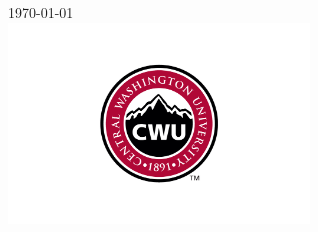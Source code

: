 \documentclass[12pt]{article}
\begin{document}
\begin{titlepage}
        
        \vspace{2cm}
        {\large \today}\\ %
        
        
        \includegraphics[width=8cm]{CWU-Logo.png}\\[.5cm] %
        
        
        \vfill %
        
    \end{titlepage}
   
    
\end{document}
